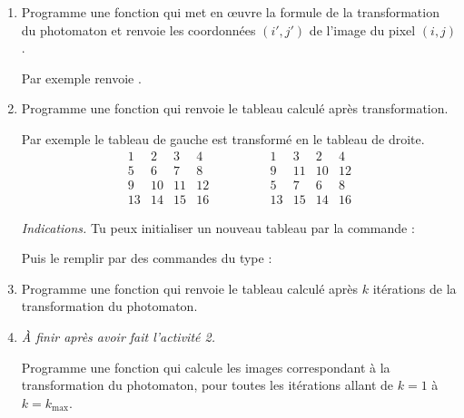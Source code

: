 \documentclass[11pt,class=report,crop=false]{standalone}
\begin{document}
\begin{activite}




\begin{enumerate}
  \item Programme une fonction  qui met en 
  \oe uvre la formule de la transformation du photomaton et renvoie les coordonnées $(i',j')$ de l'image du pixel $(i,j)$.
  
  Par exemple  renvoie .
  
  \item Programme une fonction  qui renvoie le tableau calculé après transformation.

Par exemple le tableau de gauche est transformé en le tableau de droite.
$$\begin{array}{cccc} 
  1& 2& 3& 4\\ 
  5& 6& 7& 8\\  
  9&10&11&12\\  
 13&14&15&16  
\end{array}\qquad\qquad
\begin{array}{cccc} 
  1& 3& 2& 4\\  
  9&11&10&12\\  
  5& 7& 6& 8\\  
 13&15&14&16
\end{array}$$

  \emph{Indications.} Tu peux initialiser un nouveau tableau par la commande :\\
  \centerline{}
  
  Puis le remplir par des commandes du type :\\
  \centerline{}

  \item Programme une fonction  qui renvoie le tableau calculé après $k$ itérations de la transformation du photomaton.
  
  \item \emph{À finir après avoir fait l'activité 2.}
  
  Programme une fonction  qui calcule 
  les images correspondant à la transformation du photomaton, pour toutes les itérations allant de $k=1$ à $k=k_{\max}$.
  

\end{enumerate}
\end{activite}
\end{document}
